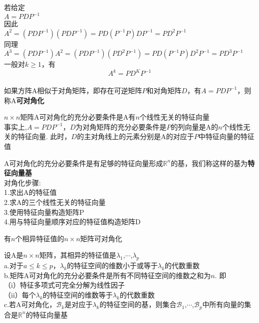 若给定\\
$A=PDP^{-1}$\\
因此\\
$A^2=(PDP^{-1})(PDP^{-1})=PD(P^{-1}P)DP^{-1}=PD^2P^{-1}$\\
同理\\
$A^3=(PDP^{-1})A^2=(PDP^{-1})(PD^2P^{-1})=PD(P^{-1}P)D^2P^{-1}=PD^3P^{-1}$\\
一般对$k\geqslant 1$，有\\
\[A^k=PD^KP^{-1}\]\\[2ex]

如果方阵A相似于对角矩阵，即存在可逆矩阵$P$和对角矩阵$D$，有$A=PDP^{-1}$，则称A\textbf{可对角化}\\[2ex]

\begin{TheoremTwo}[对角化定理]
$n\times n$矩阵A可对角化的充分必要条件是A有$n$个线性无关的特征向量\\
事实上,$A=PDP^{-1}$，$D$为对角矩阵的充分必要条件是$P$的列向量是A的$n$个线性无关的特征向量. 此时，$D$的主对角线上的元素分别是A的对应于$P$中特征向量的特征值
\end{TheoremTwo}\vspace{4ex}

A可对角化的充分必要条件是有足够的特征向量形成$\mathbb{R}^n$的基，我们称这样的基为\textbf{特征向量基}\\[2ex]

对角化步骤:\\
1.求出A的特征值\\
2.求A的三个线性无关的特征向量\\
3.使用特征向量构造矩阵P\\
4.用与特征向量顺序对应的特征值构造矩阵D\\[2ex]

\begin{TheoremOne}
有$n$个相异特征值的$n\times n$矩阵可对角化
\end{TheoremOne}\vspace{4ex}

\begin{TheoremOne}
设A是$n\times n$矩阵，其相异的特征值是$\lambda_1$,$\cdots$,$\lambda_p$\\
a.对于$a\leqslant k\leqslant p$，$\lambda_k$的特征空间的维数小于或等于$\lambda_k$的代数重数\\
b.矩阵A可对角化的充分必要条件是所有不同特征空间的维数之和为$n$. 即\\
\phantom{\quad}（i）特征多项式可完全分解为线性因子\\
\phantom{\quad}（ii）每个$\lambda_k$的特征空间的维数等于$\lambda_k$的代数重数\\
c.若A可对角化，$\mathcal{B}_k$是对应于$\lambda_k$的特征空间的基，则集合$\mathcal{B}_1$,$\cdots$,$\mathcal{B}_p$中所有向量的集合是$\mathbb{R}^n$的特征向量基
\end{TheoremOne}\vspace{4ex}

